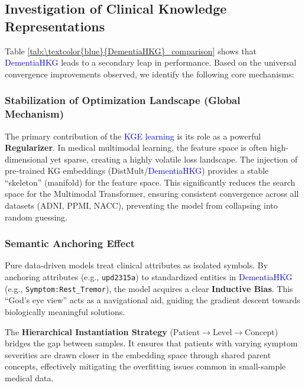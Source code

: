 \documentclass[lettersize,journal]{IEEEtran}
\begin{document}
\subsection{Investigation of Clinical Knowledge Representations}

    Table \ref{tab:\textcolor{blue}{DementiaHKG}_comparison} shows that \textcolor{blue}{DementiaHKG} leads to a secondary leap in performance. Based on the universal convergence improvements observed, we identify the following core mechanisms:

    \subsubsection{Stabilization of Optimization Landscape (Global Mechanism)}
    
    The primary contribution of the \textcolor{blue}{KGE learning} is its role as a powerful \textbf{Regularizer}. In medical multimodal learning, the feature space is often high-dimensional yet sparse, creating a highly volatile loss landscape. The injection of pre-trained KG embeddings (DistMult/\textcolor{blue}{DementiaHKG}) provides a stable ``skeleton'' (manifold) for the feature space. This significantly reduces the search space for the Multimodal Transformer, ensuring consistent convergence across all datasets (ADNI, PPMI, NACC), preventing the model from collapsing into random guessing.

\subsubsection{Semantic Anchoring Effect}

    Pure data-driven models treat clinical attributes as isolated symbols. By anchoring attributes (e.g., \texttt{upd2315a}) to standardized entities in \textcolor{blue}{DementiaHKG} (e.g., \texttt{Symptom:Rest\_Tremor}), the model acquires a clear \textbf{Inductive Bias}. This ``God's eye view'' acts as a navigational aid, guiding the gradient descent towards biologically meaningful solutions.

    The \textbf{Hierarchical Instantiation Strategy} ($\text{Patient} \to \text{Level} \to \text{Concept}$) bridges the gap between samples. It ensures that patients with varying symptom severities are drawn closer in the embedding space through shared parent concepts, effectively mitigating the overfitting issues common in small-sample medical data.



    
\end{document}
